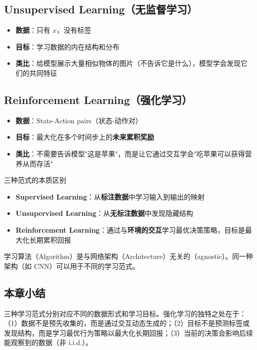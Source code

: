 \documentclass[a4paper]{article}
\begin{document}
\subsection{Unsupervised Learning（无监督学习）}

\begin{itemize}
    \item \textbf{数据}：只有 $x$，没有标签
    \item \textbf{目标}：学习数据的内在结构和分布
    \item \textbf{类比}：给模型展示大量相似物体的图片（不告诉它是什么），模型学会发现它们的共同特征
\end{itemize}

\subsection{Reinforcement Learning（强化学习）}

\begin{itemize}
    \item \textbf{数据}：State-Action pairs（状态-动作对）
    \item \textbf{目标}：最大化在多个时间步上的\textbf{未来累积奖励}
    \item \textbf{类比}：不需要告诉模型"这是苹果"，而是让它通过交互学会"吃苹果可以获得营养从而存活"
\end{itemize}

\begin{importantbox}{三种范式的本质区别}
\begin{itemize}
    \item \textbf{Supervised Learning}：从\textbf{标注数据}中学习输入到输出的映射
    \item \textbf{Unsupervised Learning}：从\textbf{无标注数据}中发现隐藏结构
    \item \textbf{Reinforcement Learning}：通过与\textbf{环境的交互}学习最优决策策略，目标是最大化长期累积回报
\end{itemize}
学习算法（Algorithm）是与网络架构（Architecture）无关的（agnostic）。同一种架构（如 CNN）可以用于不同的学习范式。
\end{importantbox}

\subsection{本章小结}
三种学习范式分别对应不同的数据形式和学习目标。强化学习的独特之处在于：（1）数据不是预先收集的，而是通过交互动态生成的；（2）目标不是预测标签或发现结构，而是学习最优行为策略以最大化长期回报；（3）当前的决策会影响后续能观察到的数据（非 i.i.d.）。
\end{document}
